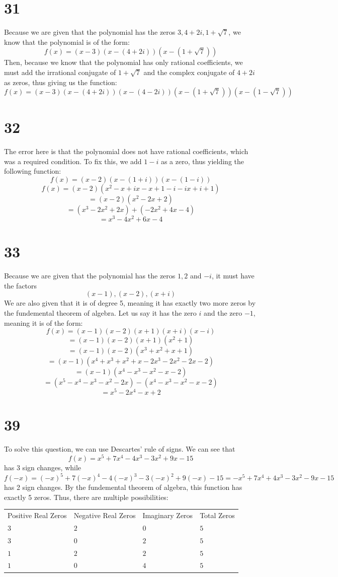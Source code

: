 \documentclass{article}
\theoremstyle{definition}
\begin{document}
\section*{31}


Because we are given that the polynomial has the zeros $3,4+2i,1+\sqrt{7}$, we know that the polynomial is of the form:
\[ f(x)=(x-3)(x-(4+2i))(x-(1+\sqrt{7})) \]
Then, because we know that the polynomial has only rational coefficients, we must add the irrational conjugate of $1+\sqrt{7}$ and the complex conjugate of 
$4+2i$ as zeros, thus giving us the function:
\[ f(x)=(x-3)(x-(4+2i))(x-(4-2i))(x-(1+\sqrt{7}))(x-(1-\sqrt{7})) \]

\section*{32}


The error here is that the polynomial does not have rational coefficients, which was a required condition. To fix this, we add $1-i$ as a zero, 
thus yielding the following function:
\[ f(x)=(x-2)(x-(1+i))(x-(1-i)) \]
\[ f(x)=(x-2)(x^2-x+ix-x+1-i-ix+i+1) \]
\[ =(x-2)(x^2-2x+2) \]
\[ =(x^3-2x^2+2x)+(-2x^2+4x-4) \]
\[ =x^3-4x^2+6x-4 \]

\section*{33}


Because we are given that the polynomial has the zeros $1,2$ and $-i$, it must have the factors \[ (x-1),(x-2),(x+i) \] We are also given that it is 
of degree 5, meaning it has exactly two more zeros by the fundemental theorem of algebra. Let us say it has the zero $i$ and the zero $-1$, meaning it 
is of the form:
\[ f(x)=(x-1)(x-2)(x+1)(x+i)(x-i) \]
\[ =(x-1)(x-2)(x+1)(x^2+1) \]
\[ =(x-1)(x-2)(x^3+x^2+x+1) \]
\[ =(x-1)(x^4+x^3+x^2+x-2x^3-2x^2-2x-2) \]
\[ =(x-1)(x^4-x^3-x^2-x-2) \]
\[ =(x^5-x^4-x^3-x^2-2x)-(x^4-x^3-x^2-x-2) \]
\[ =x^5-2x^4-x+2 \]

\section*{39}


To solve this question, we can use Descartes' rule of signs. We can see that \[ f(x)=x^5+7x^4-4x^3-3x^2+9x-15 \] has 3 sign changes, while 
\[ f(-x)=(-x)^5+7(-x)^4-4(-x)^3-3(-x)^2+9(-x)-15=-x^5+7x^4+4x^3-3x^2-9x-15 \] has 2 sign changes. By the fundemental theorem of algebra, this function has 
exactly 5 zeros. Thus, there are multiple possibilities:
\begin{center}
	\begin{tabular}{l|l|l|l}
		Positive Real Zeros & Negative Real Zeros & Imaginary Zeros & Total Zeros \\
		$3$ & $2$ & $0$ & $5$ \\
		$3$ & $0$ & $2$ & $5$ \\
		$1$ & $2$ & $2$ & $5$ \\
		$1$ & $0$ & $4$ & $5$
	\end{tabular}
\end{center}
\end{document}
